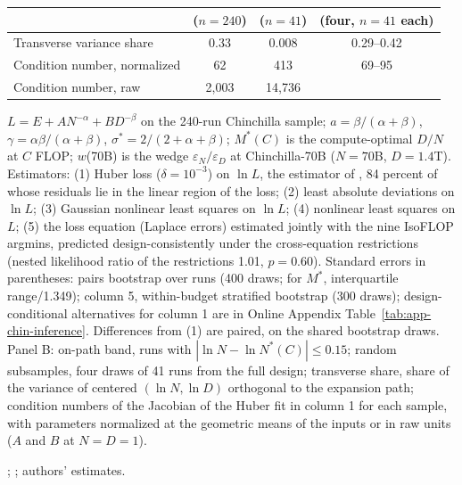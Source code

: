 \begin{table}[tp]
\begin{tabular*}{\textwidth}{@{\extracolsep{\fill}}lccccc@{}}
 & ($n=240$) & \multicolumn{2}{c}{($n=41$)} & \multicolumn{2}{c}{(four, $n=41$ each)} \\
\midrule
Transverse variance share & 0.33 & \multicolumn{2}{c}{0.008} & \multicolumn{2}{c}{0.29--0.42} \\
Condition number, normalized & 62 & \multicolumn{2}{c}{413} & \multicolumn{2}{c}{69--95} \\
Condition number, raw & 2,003 & \multicolumn{2}{c}{14,736} & \multicolumn{2}{c}{} \\
\bottomrule
\end{tabular*}
\par\smallskip
\begin{tablenotes}
$L=E+AN^{-\alpha}+BD^{-\beta}$ on the 240-run Chinchilla sample; $a=\beta/(\alpha+\beta)$, $\gamma=\alpha\beta/(\alpha+\beta)$,
$\sigma^*=2/(2+\alpha+\beta)$; $M^*(C)$ is the compute-optimal $D/N$ at $C$ FLOP; $w$(70B) is the wedge
$\varepsilon_N/\varepsilon_D$ at Chinchilla-70B ($N=70$B, $D=1.4$T). Estimators: (1) Huber loss ($\delta=10^{-3}$) on
$\ln L$, the estimator of \citet{besiroglu2024chinchilla}, 84 percent of whose residuals lie in the linear region of the
loss; (2) least absolute deviations on $\ln L$; (3) Gaussian nonlinear least squares on $\ln L$; (4) nonlinear least
squares on $L$; (5) the loss equation (Laplace errors) estimated jointly with the nine IsoFLOP argmins, predicted
design-consistently under the cross-equation restrictions (nested likelihood ratio of the restrictions 1.01,
$p=0.60$). Standard errors in parentheses: pairs bootstrap over runs (400 draws; for $M^*$, interquartile range/1.349);
column 5, within-budget stratified bootstrap (300 draws); design-conditional alternatives for column 1 are in Online
Appendix Table~\ref{tab:app-chin-inference}. Differences from (1) are paired, on the shared bootstrap draws. Panel B: on-path band,
runs with $|\ln N-\ln N^*(C)|\le0.15$; random subsamples, four draws of 41 runs from the full design; transverse share,
share of the variance of centered $(\ln N,\ln D)$ orthogonal to the expansion path; condition numbers of the Jacobian of
the Huber fit in column 1 for each sample, with parameters normalized at the geometric means of the inputs
\citep{klump2007factor} or in raw units ($A$ and $B$ at $N=D=1$).
\end{tablenotes}
\begin{tablenotes}[Source]
\citet{hoffmann2022training}; \citet{besiroglu2024chinchilla}; authors' estimates.
\end{tablenotes}
\end{table}
